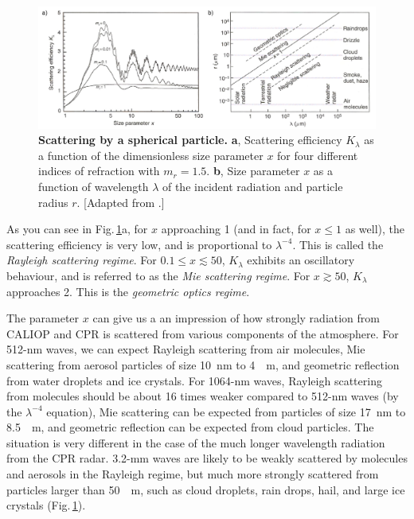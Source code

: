 \begin{figure}[t]
\includegraphics[width=\textwidth]{images/scattering.pdf}
\caption[Scattering by a spherical particle]{\textbf{Scattering by a spherical particle.}
\textbf{a}, Scattering efficiency $K_\lambda$ as a
function of the dimensionless size parameter $x$
for four different indices of refraction with $m_r = 1.5$.
\textbf{b}, Size parameter $x$ as a function of wavelength $\lambda$ of the
incident radiation and particle radius $r$.
[Adapted from \cite{WallaceHobbs2006}.]}
\label{fig:scattering}
\end{figure}

As you can see in Fig.\,\ref{fig:scattering}a, for $x$ approaching 1 (and in fact, for $x \leq 1$ as well), the scattering
efficiency is very low, and is proportional to $\lambda^{-4}$. This is
called the \textit{Rayleigh scattering regime}. For $0.1 \leq x \lesssim 50$,
$K_\lambda$
exhibits an oscillatory behaviour, and is referred to as the \textit{Mie
scattering regime}.
For $x \gtrsim 50$, $K_\lambda$ approaches 2. This is the \textit{geometric optics
regime}.

The parameter $x$ can give us a an impression of how strongly radiation from
CALIOP and CPR is scattered from various components of the atmosphere. For
512-nm waves, we can expect Rayleigh scattering from air molecules, Mie
scattering from aerosol particles of size \SI{10}{nm} to \SI{4}{{\textmu}m}, and
geometric reflection from water droplets and ice crystals.
For 1064-nm waves,
Rayleigh scattering from molecules should be about 16 times weaker compared to
512-nm waves (by the $\lambda^{-4}$ equation), Mie scattering can be expected
from particles of size \SI{17}{nm} to \SI{8.5}{{\textmu}m}, and geometric
reflection can be expected from cloud particles.
The situation is very different in the case of the much longer wavelength
radiation from the CPR radar. 3.2-mm waves are likely to be weakly scattered by
molecules and aerosols in the Rayleigh regime, but much more strongly scattered
from particles larger than \SI{50}{{\textmu}m}, such as cloud droplets, rain
drops, hail, and large ice crystals (Fig.\,\ref{fig:scattering}).

